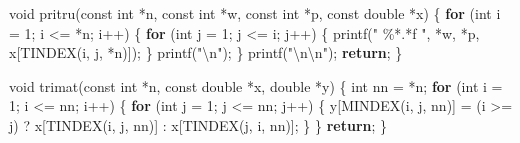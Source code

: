 \documentclass[
  12pt,
  letterpaper,
  DIV=11,
  numbers=noendperiod]{scrreprt}
\newenvironment{Shaded}{\begin{snugshade}}{\end{snugshade}}
\newcommand{\ControlFlowTok}[1]{\textcolor[rgb]{0.00,0.23,0.31}{\textbf{#1}}}
\newcommand{\DataTypeTok}[1]{\textcolor[rgb]{0.68,0.00,0.00}{#1}}
\newcommand{\DecValTok}[1]{\textcolor[rgb]{0.68,0.00,0.00}{#1}}
\newcommand{\NormalTok}[1]{\textcolor[rgb]{0.00,0.23,0.31}{#1}}
\newcommand{\OperatorTok}[1]{\textcolor[rgb]{0.37,0.37,0.37}{#1}}
\newcommand{\SpecialCharTok}[1]{\textcolor[rgb]{0.37,0.37,0.37}{#1}}
\newcommand{\StringTok}[1]{\textcolor[rgb]{0.13,0.47,0.30}{#1}}
\theoremstyle{remark}
\begin{document}
\begin{Shaded}
\begin{Highlighting}[]
\DataTypeTok{void}\NormalTok{ pritru}\OperatorTok{(}\DataTypeTok{const} \DataTypeTok{int} \OperatorTok{*}\NormalTok{n}\OperatorTok{,} \DataTypeTok{const} \DataTypeTok{int} \OperatorTok{*}\NormalTok{w}\OperatorTok{,} \DataTypeTok{const} \DataTypeTok{int} \OperatorTok{*}\NormalTok{p}\OperatorTok{,} \DataTypeTok{const} \DataTypeTok{double} \OperatorTok{*}\NormalTok{x}\OperatorTok{)} \OperatorTok{\{}
    \ControlFlowTok{for} \OperatorTok{(}\DataTypeTok{int}\NormalTok{ i }\OperatorTok{=} \DecValTok{1}\OperatorTok{;}\NormalTok{ i }\OperatorTok{\textless{}=} \OperatorTok{*}\NormalTok{n}\OperatorTok{;}\NormalTok{ i}\OperatorTok{++)} \OperatorTok{\{}
        \ControlFlowTok{for} \OperatorTok{(}\DataTypeTok{int}\NormalTok{ j }\OperatorTok{=} \DecValTok{1}\OperatorTok{;}\NormalTok{ j }\OperatorTok{\textless{}=}\NormalTok{ i}\OperatorTok{;}\NormalTok{ j}\OperatorTok{++)} \OperatorTok{\{}
\NormalTok{            printf}\OperatorTok{(}\StringTok{" }\SpecialCharTok{\%*.*f}\StringTok{ "}\OperatorTok{,} \OperatorTok{*}\NormalTok{w}\OperatorTok{,} \OperatorTok{*}\NormalTok{p}\OperatorTok{,}\NormalTok{ x}\OperatorTok{[}\NormalTok{TINDEX}\OperatorTok{(}\NormalTok{i}\OperatorTok{,}\NormalTok{ j}\OperatorTok{,} \OperatorTok{*}\NormalTok{n}\OperatorTok{)]);}
        \OperatorTok{\}}
\NormalTok{        printf}\OperatorTok{(}\StringTok{"}\SpecialCharTok{\textbackslash{}n}\StringTok{"}\OperatorTok{);}
    \OperatorTok{\}}
\NormalTok{    printf}\OperatorTok{(}\StringTok{"}\SpecialCharTok{\textbackslash{}n\textbackslash{}n}\StringTok{"}\OperatorTok{);}
    \ControlFlowTok{return}\OperatorTok{;}
\OperatorTok{\}}

\DataTypeTok{void}\NormalTok{ trimat}\OperatorTok{(}\DataTypeTok{const} \DataTypeTok{int} \OperatorTok{*}\NormalTok{n}\OperatorTok{,} \DataTypeTok{const} \DataTypeTok{double} \OperatorTok{*}\NormalTok{x}\OperatorTok{,} \DataTypeTok{double} \OperatorTok{*}\NormalTok{y}\OperatorTok{)} \OperatorTok{\{}
    \DataTypeTok{int}\NormalTok{ nn }\OperatorTok{=} \OperatorTok{*}\NormalTok{n}\OperatorTok{;}
    \ControlFlowTok{for} \OperatorTok{(}\DataTypeTok{int}\NormalTok{ i }\OperatorTok{=} \DecValTok{1}\OperatorTok{;}\NormalTok{ i }\OperatorTok{\textless{}=}\NormalTok{ nn}\OperatorTok{;}\NormalTok{ i}\OperatorTok{++)} \OperatorTok{\{}
        \ControlFlowTok{for} \OperatorTok{(}\DataTypeTok{int}\NormalTok{ j }\OperatorTok{=} \DecValTok{1}\OperatorTok{;}\NormalTok{ j }\OperatorTok{\textless{}=}\NormalTok{ nn}\OperatorTok{;}\NormalTok{ j}\OperatorTok{++)} \OperatorTok{\{}
\NormalTok{            y}\OperatorTok{[}\NormalTok{MINDEX}\OperatorTok{(}\NormalTok{i}\OperatorTok{,}\NormalTok{ j}\OperatorTok{,}\NormalTok{ nn}\OperatorTok{)]} \OperatorTok{=}
                \OperatorTok{(}\NormalTok{i }\OperatorTok{\textgreater{}=}\NormalTok{ j}\OperatorTok{)} \OperatorTok{?}\NormalTok{ x}\OperatorTok{[}\NormalTok{TINDEX}\OperatorTok{(}\NormalTok{i}\OperatorTok{,}\NormalTok{ j}\OperatorTok{,}\NormalTok{ nn}\OperatorTok{)]} \OperatorTok{:}\NormalTok{ x}\OperatorTok{[}\NormalTok{TINDEX}\OperatorTok{(}\NormalTok{j}\OperatorTok{,}\NormalTok{ i}\OperatorTok{,}\NormalTok{ nn}\OperatorTok{)];}
        \OperatorTok{\}}
    \OperatorTok{\}}
    \ControlFlowTok{return}\OperatorTok{;}
\OperatorTok{\}}


\end{Highlighting}
\end{Shaded}
\end{document}
